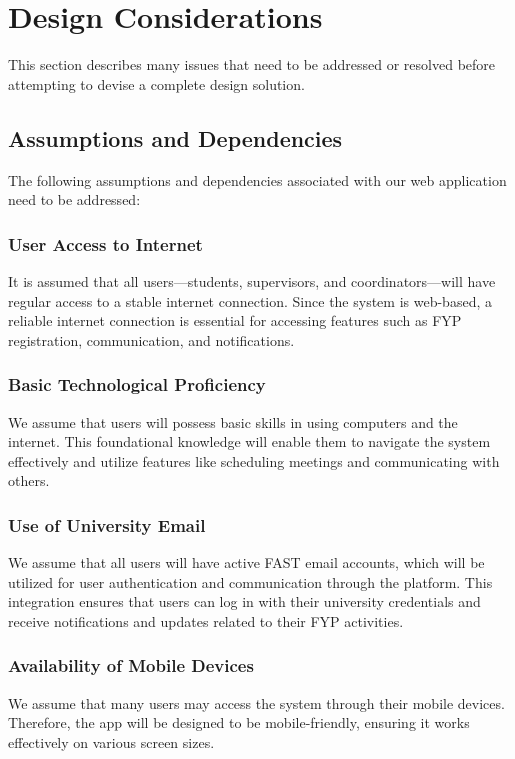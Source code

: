 \documentclass{FastFyp}
\begin{document}
\section{Design Considerations}
This section describes many issues that need to be addressed or resolved before attempting to devise a complete design solution.

\subsection{Assumptions and Dependencies}
The following assumptions and dependencies associated with our web application need to be addressed:

\subsubsection{User Access to Internet}
It is assumed that all users—students, supervisors, and coordinators—will have regular access to a stable internet connection. Since the system is web-based, a reliable internet connection is essential for accessing features such as FYP registration, communication, and notifications.

\subsubsection{Basic Technological Proficiency}
We assume that users will possess basic skills in using computers and the internet. This foundational knowledge will enable them to navigate the system effectively and utilize features like scheduling meetings and communicating with others.

\subsubsection{Use of University Email}
We assume that all users will have active FAST email accounts, which will be utilized for user authentication and communication through the platform. This integration ensures that users can log in with their university credentials and receive notifications and updates related to their FYP activities.

\subsubsection{Availability of Mobile Devices}
We assume that many users may access the system through their mobile devices. Therefore, the app will be designed to be mobile-friendly, ensuring it works effectively on various screen sizes.
\end{document}
